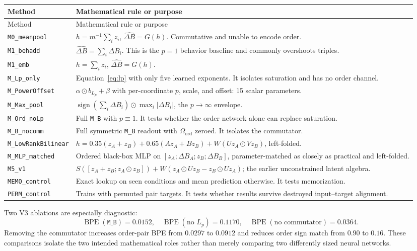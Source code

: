 \documentclass[11pt,a4paper]{article}
\newcommand{\od}{\odot}
\newcommand{\dB}{\Delta B}
\newcommand{\dBh}{\widehat{\Delta B}}
\newcommand{\MB}{\texttt{M\_B}}
\newcommand{\sign}{\operatorname{sign}}
\newcommand{\BPE}{\operatorname{BPE}}
\begin{document}
\begin{longtable}{>{\raggedright\arraybackslash}p{}
                  >{\raggedright\arraybackslash}p{}}
\toprule
Method & Mathematical rule or purpose\\
\midrule
\endfirsthead
\toprule
Method & Mathematical rule or purpose\\
\midrule
\endhead
\texttt{M0\_meanpool} & $h=m^{-1}\sum_i z_i$, $\dBh=G(h)$.  Commutative and unable to encode order.\\
\texttt{M1\_behadd} & $\dBh=\sum_i\dB_i$.  This is the $p=1$ behavior baseline and commonly overshoots triples.\\
\texttt{M1\_emb} & $h=\sum_i z_i$, $\dBh=G(h)$.\\
\texttt{M\_Lp\_only} & Equation~\eqref{eq:lp} with only five learned exponents.  It isolates saturation and has no order channel.\\
\texttt{M\_PowerOffset} & $\alpha\od b_{L_p}+\beta$ with per-coordinate $p$, scale, and offset: 15 scalar parameters.\\
\texttt{M\_Max\_pool} & $\sign(\sum_i\dB_i)\od\max_i|\dB_i|$, the $p\to\infty$ envelope.\\
\texttt{M\_Ord\_noLp} & Full \MB{} with $p\equiv1$.  It tests whether the order network alone can replace saturation.\\
\texttt{M\_B\_nocomm} & Full symmetric \MB{} readout with $\Omega_{\mathrm{ord}}$ zeroed.  It isolates the commutator.\\
\texttt{M\_LowRankBilinear} & $h=0.35(z_A+z_B)+0.65(Az_A+Bz_B)+W(Uz_A\od Vz_B)$, left-folded.\\
\texttt{M\_MLP\_matched} & Ordered black-box MLP on $[z_A;\dB_A;z_B;\dB_B]$, parameter-matched as closely as practical and left-folded.\\
\texttt{M5\_v1} & $S([z_A+z_B;z_A\od z_B])+W(z_A\od Uz_B-z_B\od Uz_A)$; the earlier unconstrained latent algebra.\\
\texttt{MEMO\_control} & Exact lookup on seen conditions and mean prediction otherwise.  It tests memorization.\\
\texttt{PERM\_control} & Trains with permuted pair targets.  It tests whether results survive destroyed input--target alignment.\\
\bottomrule
\end{longtable}

Two V3 ablations are especially diagnostic:
\[
\BPE(\MB)=0.0152,
\quad
\BPE(\text{no }L_p)=0.1170,
\quad
\BPE(\text{no commutator})=0.0364.
\]
Removing the commutator increases order-pair BPE from $0.0297$ to $0.0912$ and
reduces order sign match from $0.90$ to $0.16$.  These comparisons isolate the
two intended mathematical roles rather than merely comparing two differently
sized neural networks.
\end{document}
